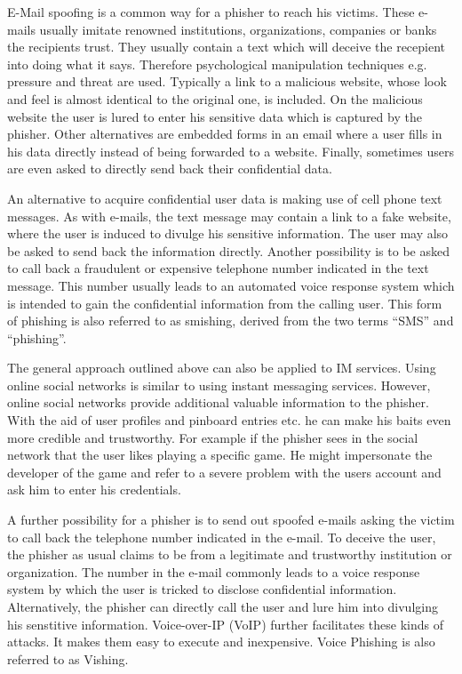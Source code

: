 \label{s:attack_channels}
\begin{description}[leftmargin=0cm]
	\item[E-Mail] E-Mail spoofing is a common way for a phisher to reach his victims.
 These e-mails usually imitate renowned institutions, organizations, companies or banks the recipients trust.
 They usually contain a text which will deceive the recepient into doing what it says. Therefore psychological manipulation techniques e.g. pressure and threat are used.
 Typically a link to a malicious website, whose look and feel is almost identical to the original one, is included.
 On the malicious website the user is lured to enter his sensitive data which is captured by the phisher.
 Other alternatives are embedded forms in an email where a user fills in his data directly instead of being forwarded to a website.
 Finally, sometimes users are even asked to directly send back their confidential data.

	\item[SMS] An alternative to acquire confidential user data is making use of cell phone text messages.
 As with e-mails, the text message may contain a link to a fake website, where the user is induced to divulge his sensitive information.
 The user may also be asked to send back the information directly.
 Another possibility is to be asked to call back a fraudulent or expensive telephone number indicated in the text message.
 This number usually leads to an automated voice response system which is intended to gain the confidential information from the calling user.
 This form of phishing is also referred to as smishing, derived from the two terms ``SMS'' and ``phishing''.
 
	\item[Instant Messaging and Online Social Networks] The general approach outlined above can also be applied to IM services. Using online social networks is similar to using instant messaging services.
 However, online social networks provide additional valuable information to the phisher.
 With the aid of user profiles and pinboard entries etc.
 he can make his baits even more credible and trustworthy. For example if the phisher sees in the social network that the user likes playing a specific game. He might impersonate the developer of the game and refer to a severe problem with the users account and ask him to enter his credentials. 

	\item[Voice Phishing] A further possibility for a phisher is to send out spoofed e-mails asking the victim to call back the telephone number indicated in the e-mail.
 To deceive the user, the phisher as usual claims to be from a legitimate and trustworthy institution or organization.
 The number in the e-mail commonly leads to a voice response system by which the user is tricked to disclose confidential information.
 Alternatively, the phisher can directly call the user and lure him into divulging his senstitive information.
 Voice-over-IP (VoIP) further facilitates these kinds of attacks.
 It makes them easy to execute and inexpensive.
 Voice Phishing is also referred to as Vishing.
 

\end{description}
